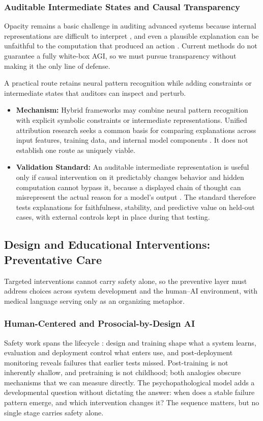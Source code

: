 \documentclass{article}
\begin{document}
\subsubsection{Auditable Intermediate States and Causal Transparency}
Opacity remains a basic challenge in auditing advanced systems because internal representations are difficult to interpret \citep{ref47}, and even a plausible explanation can be unfaithful to the computation that produced an action \citep{ref45}. Current methods do not guarantee a fully white-box AGI, so we must pursue transparency without making it the only line of defense.

A practical route retains neural pattern recognition while adding constraints or intermediate states that auditors can inspect and perturb.
\begin{itemize}
    \item \textbf{Mechanism:} Hybrid frameworks may combine neural pattern recognition with explicit symbolic constraints or intermediate representations. Unified attribution research seeks a common basis for comparing explanations across input features, training data, and internal model components \citep{ref35}. It does not establish one route as uniquely viable.
    \item \textbf{Validation Standard:} An auditable intermediate representation is useful only if causal intervention on it predictably changes behavior and hidden computation cannot bypass it, because a displayed chain of thought can misrepresent the actual reason for a model's output \citep{ref94}. The standard therefore tests explanations for faithfulness, stability, and predictive value on held-out cases, with external controls kept in place during that testing.
\end{itemize}

\subsection{Design and Educational Interventions: Preventative Care}
Targeted interventions cannot carry safety alone, so the preventive layer must address choices across system development and the human--AI environment, with medical language serving only as an organizing metaphor.

\subsubsection{Human-Centered and Prosocial-by-Design AI}
Safety work spans the lifecycle \citep{ref76}: design and training shape what a system learns, evaluation and deployment control what enters use, and post-deployment monitoring reveals failures that earlier tests missed. Post-training is not inherently shallow, and pretraining is not childhood; both analogies obscure mechanisms that we can measure directly. The psychopathological model adds a developmental question without dictating the answer: when does a stable failure pattern emerge, and which intervention changes it? The sequence matters, but no single stage carries safety alone.
\end{document}
